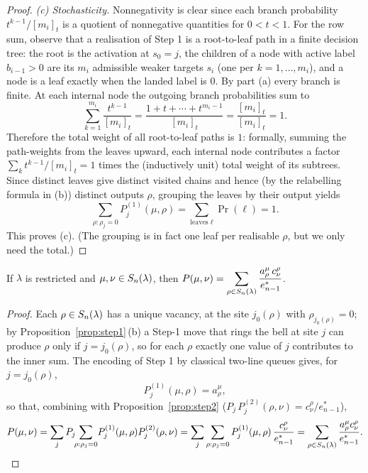 \begin{proof}
\smallskip
\noindent\emph{(c) Stochasticity.} Nonnegativity is clear since each branch
probability $t^{k-1}/[m_i]_t$ is a quotient of nonnegative quantities for
$0<t<1$. For the row sum, observe that a realisation of Step 1 is a root-to-leaf
path in a finite decision tree: the root is the activation at $s_0=j$, the
children of a node with active label $b_{i-1}>0$ are its $m_i$ admissible weaker
targets $s_i$ (one per $k=1,\dots,m_i$), and a node is a leaf exactly when the
landed label is $0$. By part (a) every branch is finite. At each internal node the
outgoing branch probabilities sum to
\[
\sum_{k=1}^{m_i}\frac{t^{k-1}}{[m_i]_t}
=\frac{1+t+\cdots+t^{m_i-1}}{[m_i]_t}=\frac{[m_i]_t}{[m_i]_t}=1 .
\]
Therefore the total weight of all root-to-leaf paths is $1$: formally, summing the
path-weights from the leaves upward, each internal node contributes a factor
$\sum_k t^{k-1}/[m_i]_t=1$ times the (inductively unit) total weight of its
subtrees. Since distinct leaves give distinct visited chains and hence (by the
relabelling formula in (b)) distinct outputs $\rho$, grouping the leaves by their
output yields
\[
\sum_{\rho:\rho_j=0}P^{(1)}_j(\mu,\rho)
=\sum_{\text{leaves }\ell}\Pr(\ell)=1 .
\]
This proves (c). (The grouping is in fact one leaf per realisable $\rho$, but we
only need the total.)
\end{proof}

\begin{qthreeproposition}\label{prop:transition}
If $\lambda$ is restricted and $\mu,\nu\in S_n(\lambda)$, then
$\displaystyle P(\mu,\nu)=\sum_{\rho\in S_n(\lambda)}\frac{a^\mu_\rho\,c^\rho_\nu}{e^*_{n-1}}$.
\end{qthreeproposition}

\begin{proof}
Each $\rho\in S_n(\lambda)$ has a unique vacancy, at the site $j_0(\rho)$ with
$\rho_{j_0(\rho)}=0$; by Proposition~\ref{prop:step1}\,(b) a Step-1 move that rings
the bell at site $j$ can produce $\rho$ only if $j=j_0(\rho)$, so for each $\rho$
exactly one value of $j$ contributes to the inner sum. The encoding of Step 1 by
classical two-line queues \cite[Lem.~5.4]{AMW25} gives, for $j=j_0(\rho)$,
\[
P^{(1)}_j(\mu,\rho)=a^\mu_\rho ,
\]
so that, combining with Proposition~\ref{prop:step2}
($P_j\,P^{(2)}_j(\rho,\nu)=c^\rho_\nu/e^*_{n-1}$),
\[
P(\mu,\nu)=\sum_j P_j\!\!\sum_{\rho:\rho_j=0}\!P^{(1)}_j(\mu,\rho)P^{(2)}_j(\rho,\nu)
=\sum_j\sum_{\rho:\rho_j=0}P^{(1)}_j(\mu,\rho)\,\frac{c^\rho_\nu}{e^*_{n-1}}
=\sum_{\rho\in S_n(\lambda)}\frac{a^\mu_\rho c^\rho_\nu}{e^*_{n-1}}.
\]
\end{proof}

